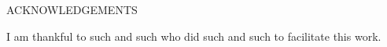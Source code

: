 \setcounter{page}{3}

\begin{center}
   {ACKNOWLEDGEMENTS}
\end{center}

I am thankful to such and such who did such and such to facilitate this work. 
 